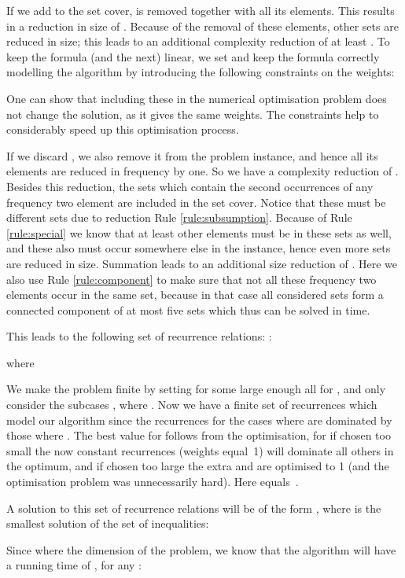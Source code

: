 \documentclass[fleqn]{stacs_proc}
\begin{document}
If we add  to the set cover,  is removed together with all its elements.
This results in a reduction in size of .
Because of the removal of these elements, other sets are reduced in size;
this leads to an additional complexity reduction of at least .
To keep the formula (and the next) linear, we set 
and keep the formula correctly modelling the algorithm by introducing the following constraints on the weights:

One can show that including these in the numerical optimisation problem
does not change the solution, as it gives the same weights.
The constraints help to considerably speed up this optimisation process.

If we discard , we also remove it from the problem instance, and hence all its elements are reduced in frequency by one.
So we have a complexity reduction of .
Besides this reduction, the sets which contain the second occurrences of any frequency two element
are included in the set cover. Notice that these must be different sets due to reduction Rule \ref{rule:subsumption}.
Because of Rule \ref{rule:special} we know that at least  other elements must be in these sets as well,
and these also must occur somewhere else in the instance, hence even more sets are reduced in size.
Summation leads to an additional size reduction of .
Here we also use Rule \ref{rule:component} to make sure that not all these frequency two elements
occur in the same set, because in that case all considered sets form a connected component of at most five sets
which thus can be solved in  time.

This leads to the following set of recurrence relations: :

where


We make the problem finite by setting for some large enough  all  for ,
and only consider the subcases , where .
Now we have a finite set of recurrences which model our algorithm since
the recurrences for the cases where  are dominated by those where .
The best value for  follows from the optimisation, for if chosen too small the now constant
recurrences (weights equal~1) will dominate all others in the optimum, and if chosen too large
the extra  and  are optimised to 1 (and the optimisation problem was unnecessarily hard).
Here  equals~.

A solution to this set of recurrence relations will be of the form , 
where  is the smallest solution of the set of inequalities:

Since  where  the dimension of the problem, we know that the algorithm
will have a running time of , for any :
\end{document}
